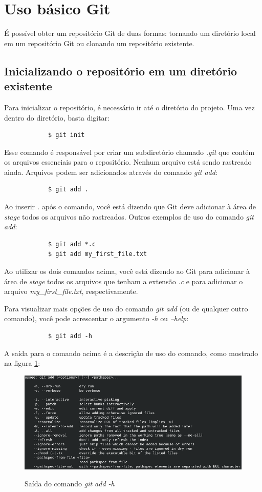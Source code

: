 \section{Uso básico Git}
    É possível obter um repositório Git de duas formas: tornando um diretório local em um repositório Git ou clonando um repositório existente.
    \subsection{Inicializando o repositório em um diretório existente}
        Para inicializar o repositório, é necessário ir até o diretório do projeto. Uma vez dentro do diretório, basta digitar:
        \begin{lstlisting}
            $ git init
        \end{lstlisting}
        Esse comando é responsável por criar um subdiretório chamado \textit{.git} que contém os arquivos essenciais para o repositório. Nenhum arquivo está sendo rastreado ainda.
        Arquivos podem ser adicionados através do comando \textit{git add}:
        \begin{lstlisting}
            $ git add .
        \end{lstlisting}
        Ao inserir \textit{.} após o comando, você está dizendo que Git deve adicionar à área de \textit{stage} todos os arquivos não rastreados. 
        Outros exemplos de uso do comando \textit{git add}:
        \begin{lstlisting}
            $ git add *.c
            $ git add my_first_file.txt
        \end{lstlisting}
        \par Ao utilizar os dois comandos acima, você está dizendo ao Git para adicionar à área de \textit{stage} todos os arquivos que tenham a extensão \textit{.c} e para adicionar o arquivo \textit{my\_first\_file.txt}, respectivamente.
        \par Para visualizar mais opções de uso do comando \textit{git add} (ou de qualquer outro comando), você pode acrescentar o argumento \textit{-h} ou \textit{--help}:
        \begin{lstlisting}
            $ git add -h
        \end{lstlisting}
        A saída para o comando acima é a descrição de uso do comando, como mostrado na figura \ref{figura:output_git_add}:
        \begin{figure}[H]
            \caption{Saída do comando \textit{git add -h}}
            \vspace{0.5cm}
            \centering
            \includegraphics[width=12cm]{images/git_add_help.png}
            \label{figura:output_git_add}
        \end{figure}

